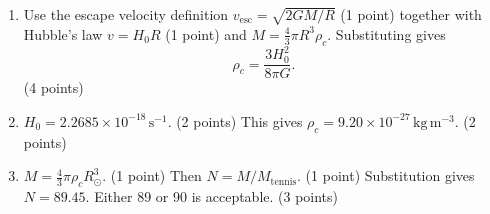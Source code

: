\begin{enumerate}
\item Use the escape velocity definition $v_{\mathrm{esc}}=\sqrt{2GM/R}$ \hfill(1 point)
together with Hubble's law $v=H_0R$ \hfill(1 point)
and $M=\tfrac43\pi R^3\rho_c$. Substituting gives
\[\rho_c=\frac{3H_0^2}{8\pi G}.\]
\hfill(4 points)
\item $H_0=2.2685\times10^{-18}\,\mathrm{s^{-1}}$. \hfill(2 points)
This gives $\rho_c=9.20\times10^{-27}\,\mathrm{kg\,m^{-3}}$. \hfill(2 points)
\item $M=\tfrac43\pi\rho_cR_\odot^3$. \hfill(1 point)
Then $N=M/M_{\mathrm{tennis}}$. \hfill(1 point)
Substitution gives $N=89.45$. Either 89 or 90 is acceptable. \hfill(3 points)
\end{enumerate}
